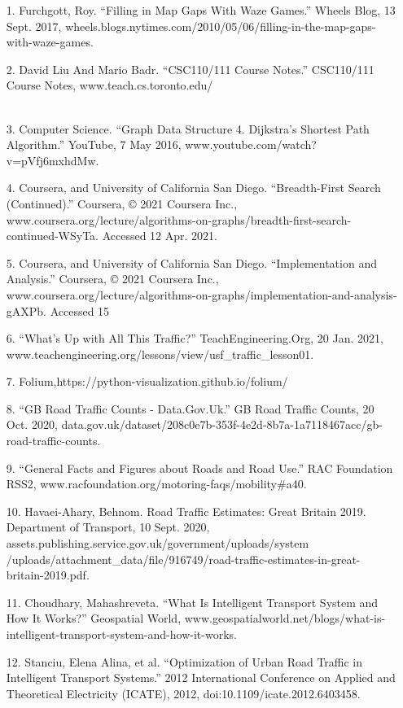 \documentclass[fontsize=11pt]{IEEEtran}
\begin{document}
\begin{enumerate}
   \item[1.] Furchgott, Roy. “Filling in Map Gaps With Waze Games.” Wheels Blog, 13 Sept. 2017, wheels.blogs.nytimes.com/2010/05/06/filling-in-the-map-gaps-with-waze-games.
   \\
   \item[2.] David Liu And Mario Badr. “CSC110/111 Course Notes.” CSC110/111 Course Notes, www.teach.cs.toronto.edu/\\%
   \\
   \item[3.] Computer Science. “Graph Data Structure 4. Dijkstra’s Shortest Path Algorithm.” YouTube, 7 May 2016, www.youtube.com/watch?v=pVfj6mxhdMw.
   \\
   \item[4.] Coursera, and University of California San Diego. “Breadth-First Search (Continued).” Coursera, © 2021 Coursera Inc., www.coursera.org/lecture/algorithms-on-graphs/breadth-first-search-continued-WSyTa. Accessed 12 Apr. 2021.
   \\
   \item[5.] Coursera, and University of California San Diego. “Implementation and Analysis.” Coursera, © 2021 Coursera Inc., www.coursera.org/lecture/algorithms-on-graphs/implementation-and-analysis-gAXPb. Accessed 15
   \\
   \item[6.] “What’s Up with All This Traffic?” TeachEngineering.Org, 20 Jan. 2021,
   \\www.teachengineering.org/lessons/view/usf\_traffic\_lesson01.
   \\
   \item[7.] Folium,https://python-visualization.github.io/folium/
   \\
   \item[8.] “GB Road Traffic Counts - Data.Gov.Uk.” GB Road Traffic Counts, 20 Oct. 2020, data.gov.uk/dataset/208c0e7b-353f-4e2d-8b7a-1a7118467acc/gb-road-traffic-counts.
   \\
   \item[9.] “General Facts and Figures about Roads and Road Use.” RAC Foundation RSS2, www.racfoundation.org/motoring-faqs/mobility#a40.
   \\
   \item[10.] Havaei-Ahary, Behnom. Road Traffic Estimates: Great Britain 2019. Department of Transport, 10 Sept. 2020, assets.publishing.service.gov.uk/government/uploads/system\\/uploads/attachment\_data/file/916749/road-traffic-estimates-in-great-britain-2019.pdf.
   \newpage
   \item[11.] Choudhary, Mahashreveta. “What Is Intelligent Transport System and How It Works?” Geospatial World, www.geospatialworld.net/blogs/what-is-intelligent-transport-system-and-how-it-works.
   \\
   \item[12.] Stanciu, Elena Alina, et al. “Optimization of Urban Road Traffic in Intelligent Transport Systems.” 2012 International Conference on Applied and Theoretical Electricity (ICATE), 2012, doi:10.1109/icate.2012.6403458.




\end{enumerate}
\end{document}
